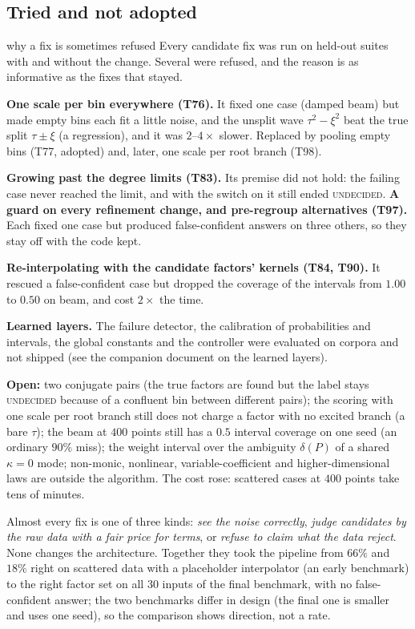 \subsection{Tried and not adopted}
\begin{explained}{why a fix is sometimes refused}
Every candidate fix was run on held-out suites with and without the change. Several were refused, and the reason is as informative as the fixes that stayed.

\medskip\textbf{One scale per bin everywhere (T76).} It fixed one case (damped beam) but made empty bins each fit a little noise, and the unsplit wave $\tau^2-\xi^2$ beat the true split $\tau\pm\xi$ (a regression), and it was $2$--$4\times$ slower. Replaced by pooling empty bins (T77, adopted) and, later, one scale per root branch (T98).

\medskip\textbf{Growing past the degree limits (T83).} Its premise did not hold: the failing case never reached the limit, and with the switch on it still ended \textsc{undecided}. \textbf{A guard on every refinement change, and pre-regroup alternatives (T97).} Each fixed one case but produced false-confident answers on three others, so they stay off with the code kept.

\medskip\textbf{Re-interpolating with the candidate factors' kernels (T84, T90).} It rescued a false-confident case but dropped the coverage of the intervals from $1.00$ to $0.50$ on beam, and cost $2\times$ the time.

\medskip\textbf{Learned layers.} The failure detector, the calibration of probabilities and intervals, the global constants and the controller were evaluated on corpora and not shipped (see the companion document on the learned layers).
\end{explained}

\begin{caution}[title=What the fixes did not close]
\textbf{Open:} two conjugate pairs (the true factors are found but the label stays \textsc{undecided} because of a confluent bin between different pairs); the scoring with one scale per root branch still does not charge a factor with no excited branch (a bare $\tau$); the beam at $400$ points still has a $0.5$ interval coverage on one seed (an ordinary $90\%$ miss); the weight interval over the ambiguity $\delta(P)$ of a shared $\kappa=0$ mode; non-monic, nonlinear, variable-coefficient and higher-dimensional laws are outside the algorithm. The cost rose: scattered cases at $400$ points take tens of minutes.
\end{caution}

\begin{takeaway}
Almost every fix is one of three kinds: \emph{see the noise correctly}, \emph{judge candidates by the raw data with a fair price for terms}, or \emph{refuse to claim what the data reject}. None changes the architecture. Together they took the pipeline from $66\%$ and $18\%$ right on scattered data with a placeholder interpolator (an early benchmark) to the right factor set on all $30$ inputs of the final benchmark, with no false-confident answer; the two benchmarks differ in design (the final one is smaller and uses one seed), so the comparison shows direction, not a rate.
\end{takeaway}
